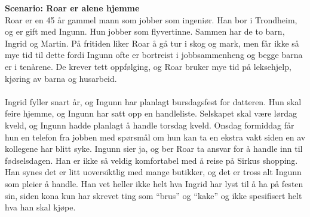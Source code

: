 \noindent\textbf{Scenario: Roar er alene hjemme}\\
Roar er en 45 år gammel mann som jobber som ingeniør. Han bor i Trondheim, og er gift med Ingunn. Hun jobber som flyvertinne. Sammen har de to barn, Ingrid og Martin. På fritiden liker Roar å gå tur i skog og mark, men får ikke så mye tid til dette fordi Ingunn ofte er bortreist i jobbsammenheng og begge barna er i tenårene. De krever tett oppfølging, og Roar bruker mye tid på leksehjelp, kjøring av barna og husarbeid. 
\\\\
Ingrid fyller snart år, og Ingunn har planlagt bursdagsfest for datteren. Hun skal feire hjemme, og Ingunn har satt opp en handleliste. Selskapet skal være lørdag kveld, og Ingunn hadde planlagt å handle torsdag kveld. Onsdag formiddag får hun en telefon fra jobben med spørsmål om hun kan ta en ekstra vakt siden en av kollegene har blitt syke. Ingunn sier ja, og ber Roar ta ansvar for å handle inn til fødselsdagen. Han er ikke så veldig komfortabel med å reise på Sirkus shopping. Han synes det er litt uoversiktlig med mange butikker, og det er tross alt Ingunn som pleier å handle. Han vet heller ikke helt hva Ingrid har lyst til å ha på festen sin, siden kona kun har skrevet ting som “brus” og “kake” og ikke spesifisert helt hva han skal kjøpe.

